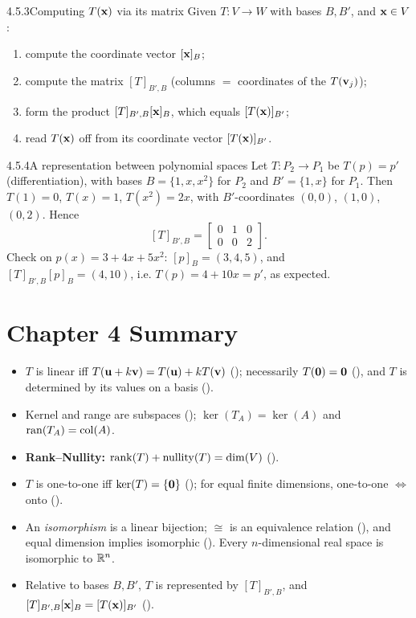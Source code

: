 \begin{algs}{4.5.3}{Computing $T(\mathbf{x})$ via its matrix}
Given $T:V\to W$ with bases $B,B'$, and $\mathbf{x}\in V$:
\begin{enumerate}[label=\textup{(\roman*)},leftmargin=2.4em,itemsep=1pt]
\item compute the coordinate vector $[\mathbf{x}]_B$;
\item compute the matrix $[T]_{B',B}$ (columns $=$ coordinates of the $T(\mathbf{v}_j)$);
\item form the product $[T]_{B',B}[\mathbf{x}]_B$, which equals $[T(\mathbf{x})]_{B'}$;
\item read $T(\mathbf{x})$ off from its coordinate vector $[T(\mathbf{x})]_{B'}$.
\end{enumerate}
\end{algs}

\begin{exmp}{4.5.4}{A representation between polynomial spaces}
Let $T:P_2\to P_1$ be $T(p)=p'$ (differentiation), with bases $B=\{1,x,x^2\}$ for $P_2$ and $B'=\{1,x\}$ for $P_1$. Then $T(1)=0$, $T(x)=1$, $T(x^2)=2x$, with $B'$-coordinates $(0,0)$, $(1,0)$, $(0,2)$. Hence
\[
[T]_{B',B}=\begin{bmatrix}0&1&0\\0&0&2\end{bmatrix}.
\]
Check on $p(x)=3+4x+5x^2$: $[p]_B=(3,4,5)$, and $[T]_{B',B}[p]_B=(4,10)$, i.e. $T(p)=4+10x=p'$, as expected.
\end{exmp}

\section*{Chapter 4 Summary}
\begin{itemize}[leftmargin=1.4em,itemsep=2pt]
\item $T$ is linear iff $T(\mathbf{u}+k\mathbf{v})=T(\mathbf{u})+kT(\mathbf{v})$ (); necessarily $T(\mathbf{0})=\mathbf{0}$ (), and $T$ is determined by its values on a basis ().
\item Kernel and range are subspaces (); $\ker(T_A)=\ker(A)$ and $\operatorname{ran}(T_A)=\operatorname{col}(A)$.
\item \textbf{Rank--Nullity:} $\operatorname{rank}(T)+\operatorname{nullity}(T)=\operatorname{dim}(V)$ ().
\item $T$ is one-to-one iff $\ker(T)=\{\mathbf{0}\}$ (); for equal finite dimensions, one-to-one $\iff$ onto ().
\item An \emph{isomorphism} is a linear bijection; $\cong$ is an equivalence relation (), and equal dimension implies isomorphic (). Every $n$-dimensional real space is isomorphic to $\mathbb{R}^n$.
\item Relative to bases $B,B'$, $T$ is represented by $[T]_{B',B}$, and $[T]_{B',B}[\mathbf{x}]_B=[T(\mathbf{x})]_{B'}$ ().
\end{itemize}

